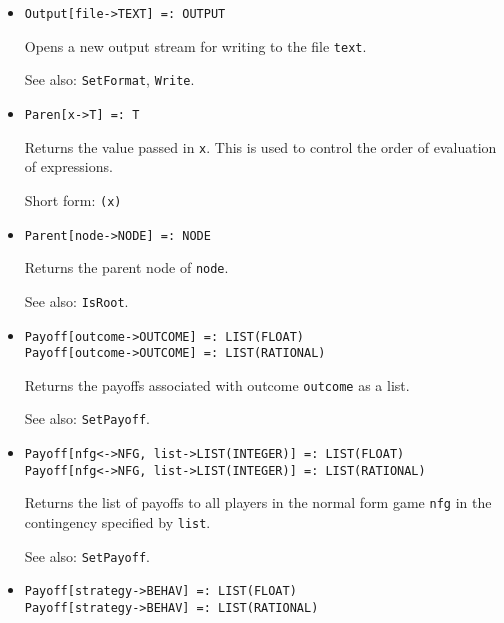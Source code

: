 \begin{itemize}
\item
\protect \large \begin{verbatim}
Output[file->TEXT] =: OUTPUT
\end{verbatim}\normalsize

\bd
Opens a new output stream for writing to the file \verb+text+.
\item
[See also:] {\tt SetFormat}, {\tt Write}.
\ed


\item
\protect \large \begin{verbatim}
Paren[x->T] =: T
\end{verbatim}\normalsize

\bd
Returns the value passed in \verb+x+.  This is used to control
the order of evaluation of expressions.
\item
[Short form:] \verb+(x)+
\ed

\item
\protect \large \begin{verbatim}
Parent[node->NODE] =: NODE
\end{verbatim}\normalsize

\bd
Returns the parent node of \verb+node+.
\item
[See also:] {\tt IsRoot}.
\ed

\item
\protect \large \begin{verbatim}
Payoff[outcome->OUTCOME] =: LIST(FLOAT)
Payoff[outcome->OUTCOME] =: LIST(RATIONAL)
\end{verbatim}\normalsize

\bd
Returns the payoffs associated with outcome \verb+outcome+
as a list.
\item
[See also:] {\tt SetPayoff}.
\ed

\item
\protect \large \begin{verbatim}
Payoff[nfg<->NFG, list->LIST(INTEGER)] =: LIST(FLOAT)
Payoff[nfg<->NFG, list->LIST(INTEGER)] =: LIST(RATIONAL)
\end{verbatim}\normalsize

\bd
Returns the list of payoffs to all players in the normal form game
\verb+nfg+ in the contingency specified by \verb+list+.
\item
[See also:] {\tt SetPayoff}.
\ed

\item
\protect \large \begin{verbatim}
Payoff[strategy->BEHAV] =: LIST(FLOAT)
Payoff[strategy->BEHAV] =: LIST(RATIONAL)
\end{verbatim}\normalsize


\end{itemize}

